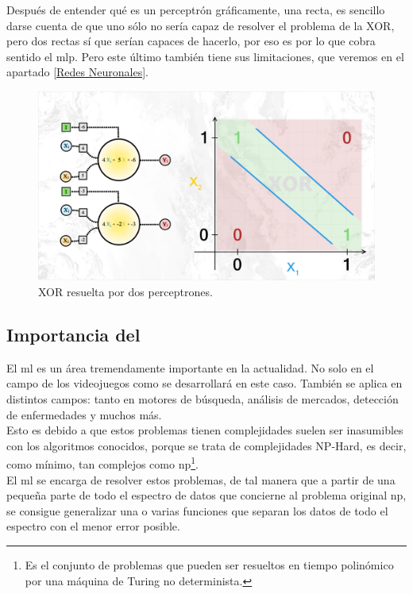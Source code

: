 Después de entender qué es un perceptrón gráficamente, una recta, es sencillo darse cuenta de que uno sólo no sería capaz de resolver el problema de la XOR, pero dos rectas sí que serían capaces de hacerlo, por eso es por lo que cobra sentido el \gls{mlp}. Pero este último también tiene sus limitaciones, que veremos en el apartado \ref{Redes Neuronales}.

\begin{figure}[h]
	\centering
	\includegraphics[width=15cm]{archivos/imagenes/problema-xor-resuelto.png}
	\caption[XOR resuelta por dos perceptrones.]{XOR resuelta por dos perceptrones.}
\end{figure}

\subsection{Importancia del }
\label{importancia ml}
El \gls{ml} es un área tremendamente importante en la actualidad. No solo en el campo de los videojuegos como se desarrollará en este caso. También se aplica en distintos campos: tanto en motores de búsqueda, análisis de mercados, detección de enfermedades y muchos más. 
\\
Esto es debido a que estos problemas tienen complejidades suelen ser inasumibles con los algoritmos conocidos, porque se trata de complejidades NP-Hard, es decir, como mínimo, tan complejos como \gls{np}\footnote{Es el conjunto de problemas que pueden ser resueltos en tiempo polinómico por una máquina de Turing no determinista.}. 
\\
El \gls{ml} se encarga de resolver estos problemas, de tal manera que a partir de una pequeña parte de todo el espectro de datos que concierne al problema original \gls{np}, se consigue generalizar una o varias funciones que separan los datos de todo el espectro con el menor error posible.

